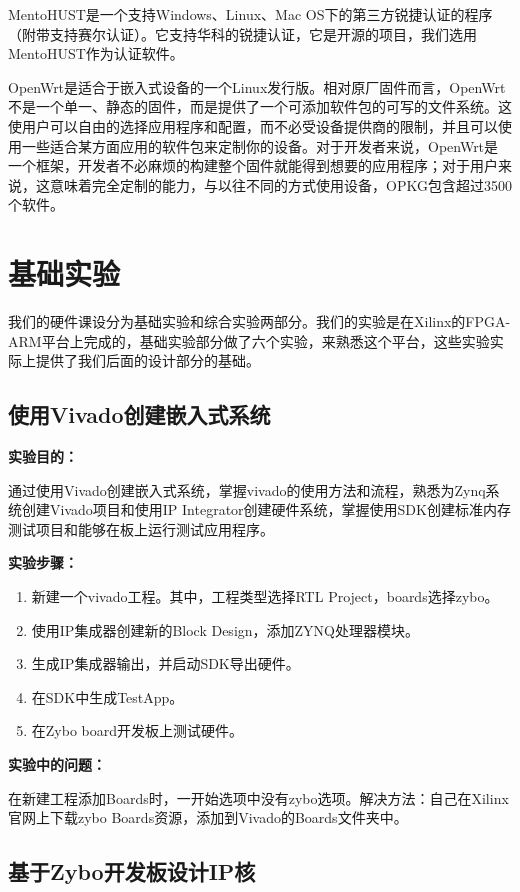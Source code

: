 \documentclass{itecreport-zh}
\begin{document}
MentoHUST是一个支持Windows、Linux、Mac OS下的第三方锐捷认证的程序（附带支持赛尔认证）。它支持华科的锐捷认证，它是开源的项目，我们选用MentoHUST作为认证软件。


OpenWrt是适合于嵌入式设备的一个Linux发行版。相对原厂固件而言，OpenWrt不是一个单一、静态的固件，而是提供了一个可添加软件包的可写的文件系统。这使用户可以自由的选择应用程序和配置，而不必受设备提供商的限制，并且可以使用一些适合某方面应用的软件包来定制你的设备。对于开发者来说，OpenWrt是一个框架，开发者不必麻烦的构建整个固件就能得到想要的应用程序；对于用户来说，这意味着完全定制的能力，与以往不同的方式使用设备，OPKG包含超过3500个软件。

\chapter{基础实验}

我们的硬件课设分为基础实验和综合实验两部分。我们的实验是在Xilinx的FPGA-ARM平台上完成的，基础实验部分做了六个实验，来熟悉这个平台，这些实验实际上提供了我们后面的设计部分的基础。
\section{使用Vivado创建嵌入式系统}
\textbf{实验目的：}


通过使用Vivado创建嵌入式系统，掌握vivado的使用方法和流程，熟悉为Zynq系统创建Vivado项目和使用IP Integrator创建硬件系统，掌握使用SDK创建标准内存测试项目和能够在板上运行测试应用程序。


\textbf{实验步骤：}

\begin{enumerate}
  \item 新建一个vivado工程。其中，工程类型选择RTL Project，boards选择zybo。
  \item 使用IP集成器创建新的Block Design，添加ZYNQ处理器模块。
  \item 生成IP集成器输出，并启动SDK导出硬件。
  \item 在SDK中生成TestApp。
  \item 在Zybo board开发板上测试硬件。
\end{enumerate}
\textbf{实验中的问题：}


在新建工程添加Boards时，一开始选项中没有zybo选项。解决方法：自己在Xilinx官网上下载zybo Boards资源，添加到Vivado的Boards文件夹中。

\section{基于Zybo开发板设计IP核}
\end{document}
